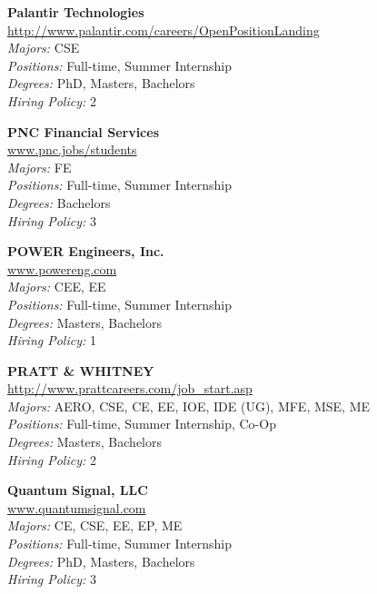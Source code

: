 \documentclass[twoside]{article}
\begin{document}
\begin{center}
\begin{multicols}{3}
\begin{minipage}{.9\columnwidth}{\Large\bf Palantir Technologies }\\
	\url{http://www.palantir.com/careers/OpenPositionLanding}\\
	\emph{Majors:} CSE\\
	\emph{Positions:} Full-time, Summer Internship\\
	\emph{Degrees:} PhD, Masters, Bachelors\\
	\emph{Hiring Policy:} 2\\
\end{minipage}
 
\begin{minipage}{.9\columnwidth}{\Large\bf PNC Financial Services }\\
	\url{www.pnc.jobs/students}\\
	\emph{Majors:} FE\\
	\emph{Positions:} Full-time, Summer Internship\\
	\emph{Degrees:} Bachelors\\
	\emph{Hiring Policy:} 3\\
\end{minipage}
 
\begin{minipage}{.9\columnwidth}{\Large\bf POWER Engineers, Inc. }\\
	\url{www.powereng.com}\\
	\emph{Majors:} CEE, EE\\
	\emph{Positions:} Full-time, Summer Internship\\
	\emph{Degrees:} Masters, Bachelors\\
	\emph{Hiring Policy:} 1\\
\end{minipage}
 
\begin{minipage}{.9\columnwidth}{\Large\bf PRATT \& WHITNEY }\\
	\url{http://www.prattcareers.com/job_start.asp}\\
	\emph{Majors:} AERO, CSE, CE, EE, IOE, IDE (UG), MFE, MSE, ME\\
	\emph{Positions:} Full-time, Summer Internship, Co-Op\\
	\emph{Degrees:} Masters, Bachelors\\
	\emph{Hiring Policy:} 2\\
\end{minipage}
 
\begin{minipage}{.9\columnwidth}{\Large\bf Quantum Signal, LLC }\\
	\url{www.quantumsignal.com}\\
	\emph{Majors:} CE, CSE, EE, EP, ME\\
	\emph{Positions:} Full-time, Summer Internship\\
	\emph{Degrees:} PhD, Masters, Bachelors\\
	\emph{Hiring Policy:} 3\\
\end{minipage}
 

\end{multicols}
\end{center}
\end{document}
